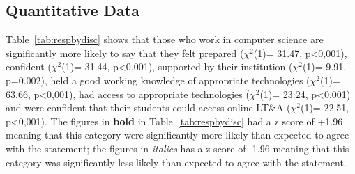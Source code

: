 \documentclass[sigconf]{acmart}
\begin{document}
\subsection{Quantitative Data}\label{quantdata}


Table~\ref{tab:respbydisc} shows that those who work in computer
science are significantly more likely to say that they felt prepared
($\chi^2$(1)= 31.47, p<0,001), confident ($\chi^2$(1)= 31.44,
p<0,001), supported by their institution ($\chi^2$(1)= 9.91, p=0.002),
held a good working knowledge of appropriate technologies
($\chi^2$(1)= 63.66, p<0,001), had access to appropriate technologies
($\chi^2$(1)= 23.24, p<0,001) and were confident that their students
could access online LT\&A ($\chi^2$(1)= 22.51, p<0,001). The figures
in {\textbf{bold}} in Table~\ref{tab:respbydisc} had a z score of
+1.96 meaning that this category were significantly more likely than
expected to agree with the statement; the figures in {\emph{italics}}
has a z score of -1.96 meaning that this category was significantly
less likely than expected to agree with the statement.
\end{document}

